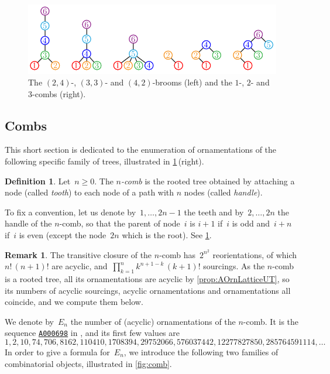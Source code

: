 \documentclass{amsart}
\theoremstyle{definition}
\newtheorem{definition}[theorem]{Definition}
\newtheorem{remark}[theorem]{Remark}
\newcommand{\darkblue}{\color{darkblue}} %
\newcommand{\defn}[1]{\textsl{\darkblue #1}} %
\newcommand{\OEIS}[1]{{\rm \href{http://oeis.org/#1}{\texttt{#1}}}}
\begin{document}
\begin{figure}
	\centerline{\includegraphics[scale=.68]{broomsCombs}}
	\caption{The $(2,4)$-, $(3,3)$- and $(4,2)$-brooms (left) and the $1$-, $2$- and $3$-combs (right).}
	\label{fig:broomsCombs}
\end{figure}

\subsection{Combs}
\label{subsec:combs}

This short section is dedicated to the enumeration of ornamentations of the following specific family of trees, illustrated in \cref{fig:broomsCombs}\,(right).


\begin{definition}
Let~$n \ge 0$.
The \defn{$n$-comb} is the rooted tree obtained by attaching a node (called \defn{tooth}) to each node of a path with $n$ nodes (called \defn{handle}).
\end{definition}

To fix a convention, let us denote by~$1, \dots, 2n-1$ the teeth and by~$2, \dots, 2n$ the handle of the $n$-comb, so that the parent of node~$i$ is $i+1$ if~$i$ is odd and~$i+n$ if~$i$ is even (except the node~$2n$ which is the root).
See \cref{fig:broomsCombs}.

\begin{remark}
The transitive closure of the $n$-comb has~$2^{n^2}$ reorientations, of which $n! \, (n+1)!$ are acyclic, and~$\prod_{k = 1}^n k^{n+1-k} \, (k+1)!$ sourcings.
As the $n$-comb is a rooted tree, all its ornamentations are acyclic by \cref{prop:AOrnLatticeUT}, so its numbers of acyclic sourcings, acyclic ornamentations and ornamentations all coincide, and we compute them below.
\end{remark}

We denote by~$E_n$ the number of (acyclic) ornamentations of the $n$-comb.
It is the sequence \OEIS{A000698} in \cite{OEIS}, and its first few values are
\[
1, 2, 10, 74, 706, 8162, 110410, 1708394, 29752066, 576037442, 12277827850, 285764591114, \dots
\]
In order to give a formula for~$E_n$, we introduce the following two families of combinatorial objects, illustrated in \cref{fig:comb}.
\end{document}

